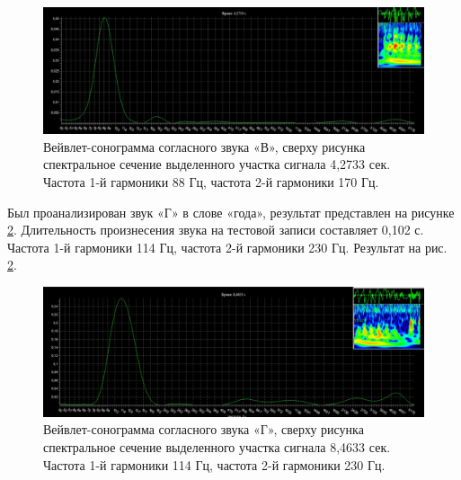 \begin{figure}
    \centering
    \includegraphics[scale=0.5]{inc/fig_11.jpg}
    \caption{
        Вейвлет-сонограмма согласного звука «В», сверху рисунка спектральное
        сечение выделенного участка сигнала 4,2733 сек. Частота 1-й гармоники
        88 Гц, частота 2-й гармоники 170 Гц.
    }
    \label{fig:fig11}
\end{figure}

Был проанализирован звук «Г» в слове «года», результат представлен на рисунке
\ref{fig:fig12}. Длительность произнесения звука на тестовой записи
составляет 0,102 с. Частота 1-й гармоники 114 Гц, частота 2-й гармоники 230 Гц.
Результат на рис. \ref{fig:fig12}.

\begin{figure}
    \centering
    \includegraphics[scale=0.5]{inc/fig_12.jpg}
    \caption{
        Вейвлет-сонограмма согласного звука «Г», сверху рисунка спектральное
        сечение выделенного участка сигнала 8,4633 сек. Частота 1-й гармоники
        114 Гц, частота 2-й гармоники 230 Гц.
    }
    \label{fig:fig12}
\end{figure}
